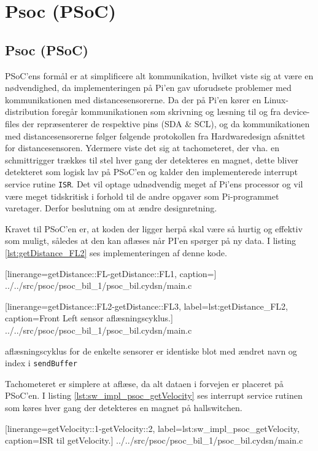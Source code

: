 \section{Psoc (PSoC)} \label{sub:sw_impl_psoc_psoc}
\subsection{Psoc (PSoC)}
PSoC'ens formål er at simplificere alt \IIC kommunikation, hvilket viste sig at være en nødvendighed, da implementeringen på Pi'en gav uforudsete problemer med kommunikationen med distancesensorerne.
Da der på Pi'en kører en Linux-distribution foregår \IIC kommunikationen som skrivning og læsning til og fra device-files der repræsenterer de respektive pins (SDA \& SCL), og da kommunikationen med distancesensorerne følger følgende protokollen fra Hardwaredesign afsnittet for distancesensoren.
Ydermere viste det sig at tachometeret, der vha. en schmittrigger trækkes til stel hver gang der detekteres en magnet, dette bliver detekteret som logisk lav på PSoC'en og  kalder den implementerede interrupt service rutine \texttt{ISR}. 
Det vil optage udnødvendig meget af Pi'ens processor og vil være meget tidskritisk i forhold til de andre opgaver som Pi-programmet varetager. Derfor beslutning om at ændre designretning.

Kravet til PSoC'en er, at koden der ligger herpå skal være så hurtig og effektiv som muligt, således at den kan aflæses når PI'en spørger på ny data. 
I listing \ref{lst:getDistance_FL2} ses implementeringen af denne kode.


	[linerange=getDistance::FL-getDistance::FL1, caption=]
	{../../src/psoc/psoc_bil_1/psoc_bil.cydsn/main.c}


	[linerange=getDistance::FL2-getDistance::FL3, label=lst:getDistance_FL2, caption=Front Left sensor aflæsningscyklus.]
	{../../src/psoc/psoc_bil_1/psoc_bil.cydsn/main.c}
	
aflæsningscyklus for de enkelte sensorer er identiske blot med ændret navn og index i \texttt{sendBuffer}

Tachometeret er simplere at aflæse, da alt dataen i forvejen er placeret på PSoC'en. I listing \ref{lst:sw_impl_psoc_getVelocity} ses interrupt service rutinen som køres hver gang der detekteres en magnet på hallswitchen.


	[linerange=getVelocity::1-getVelocity::2, label=lst:sw_impl_psoc_getVelocity, caption=ISR til getVelocity.]
	{../../src/psoc/psoc_bil_1/psoc_bil.cydsn/main.c}


